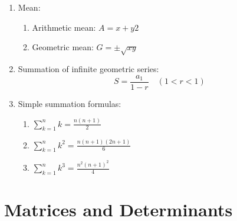 \documentclass{report}
\begin{document}
\begin{multicols}{2}
\begin{enumerate}
        \item Mean:
              \begin{enumerate}
                  \item Arithmetic mean: $A = {x+y}{2}$
                  \item Geometric mean: $G = \pm\sqrt{xy}$
              \end{enumerate}
        \item Summation of infinite geometric series: \[S = \frac{a_1}{1-r} \quad (1 < r < 1)\]
        \item Simple summation formulas:
              \begin{enumerate}
                  \item $\sum_{k=1}^n k = \frac{n(n+1)}{2}$
                  \item $\sum_{k=1}^n k^2 = \frac{n(n+1)(2n+1)}{6}$
                  \item $\sum_{k=1}^n k^3 = \frac{n^2(n+1)^2}{4}$
              \end{enumerate}
    \end{enumerate}

    \setcounter{section}{13}
    \section{Matrices and Determinants}


\end{multicols}
\end{document}
